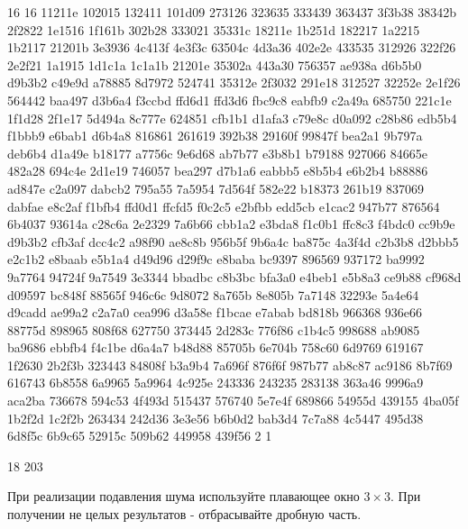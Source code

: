 \footnotesize
\begin{myverbbox}[\small]{\vinput}
16 16
11211e 102015 132411 101d09 273126 323635 333439 363437
3f3b38 38342b 2f2822 1e1516 1f161b 302b28 333021 35331c
18211e 1b251d 182217 1a2215 1b2117 21201b 3e3936 4c413f
4e3f3c 63504c 4d3a36 402e2e 433535 312926 322f26 2e2f21
1a1915 1d1c1a 1c1a1b 21201e 35302a 443a30 756357 ae938a
d6b5b0 d9b3b2 c49e9d a78885 8d7972 524741 35312e 2f3032
291e18 312527 32252e 2e1f26 564442 baa497 d3b6a4 f3ccbd
ffd6d1 ffd3d6 fbc9c8 eabfb9 c2a49a 685750 221c1e 1f1d28
2f1e17 5d494a 8c777e 624851 cfb1b1 d1afa3 c79e8c d0a092
c28b86 edb5b4 f1bbb9 e6bab1 d6b4a8 816861 261619 392b38
29160f 99847f bea2a1 9b797a deb6b4 d1a49e b18177 a7756c
9e6d68 ab7b77 e3b8b1 b79188 927066 84665e 482a28 694c4e
2d1e19 746057 bea297 d7b1a6 eabbb5 e8b5b4 e6b2b4 b88886
ad847e c2a097 dabcb2 795a55 7a5954 7d564f 582e22 b18373
261b19 837069 dabfae e8c2af f1bfb4 ffd0d1 ffcfd5 f0c2c5
e2bfbb edd5cb e1cac2 947b77 876564 6b4037 93614a c28c6a
2e2329 7a6b66 cbb1a2 e3bda8 f1c0b1 ffc8c3 f4bdc0 cc9b9e
d9b3b2 cfb3af dcc4c2 a98f90 ae8c8b 956b5f 9b6a4c ba875c
4a3f4d c2b3b8 d2bbb5 e2c1b2 e8baab e5b1a4 d49d96 d29f9c
e8baba bc9397 896569 937172 ba9992 9a7764 94724f 9a7549
3e3344 bbadbc c8b3bc bfa3a0 e4beb1 e5b8a3 ce9b88 cf968d
d09597 bc848f 88565f 946c6c 9d8072 8a765b 8e805b 7a7148
32293e 5a4e64 d9cadd ae99a2 c2a7a0 cea996 d3a58e f1bcae
e7abab bd818b 966368 936e66 88775d 898965 808f68 627750
373445 2d283c 776f86 c1b4c5 998688 ab9085 ba9686 ebbfb4
f4c1be d6a4a7 b48d88 85705b 6e704b 758c60 6d9769 619167
1f2630 2b2f3b 323443 84808f b3a9b4 7a696f 876f6f 987b77
ab8c87 ac9186 8b7f69 616743 6b8558 6a9965 5a9964 4c925e
243336 243235 283138 363a46 9996a9 aca2ba 736678 594c53
4f493d 515437 576740 5e7e4f 689866 54955d 439155 4ba05f
1b2f2d 1c2f2b 263434 242d36 3e3e56 b6b0d2 bab3d4 7c7a88 
4c5447 495d38 6d8f5c 6b9c65 52915c 509b62 449958 439f56
2
1
\end{myverbbox}
\begin{myverbbox}[\small]{\voutput}
18 203
\end{myverbbox}
\normalsize

\commentsSection

При реализации подавления шума используйте плавающее окно $3 \times 3$. При получении не целых результатов - отбрасывайте дробную часть.

